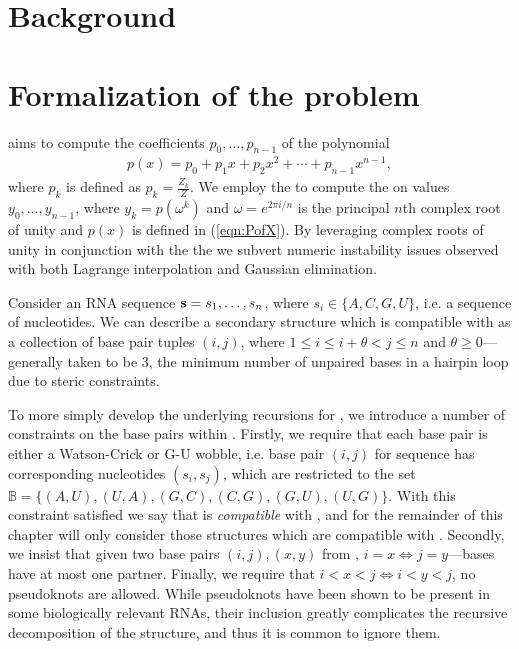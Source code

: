 \section{Background}

\section{Formalization of the problem}

\FFTbor aims to compute the coefficients $p_0,\ldots,p_{n-1}$ of the polynomial
\begin{eqnarray}
\label{eqn:PofX}
p(x) = p_0 + p_1 x + p_2 x^2 + \cdots + p_{n-1} x^{n-1},
\end{eqnarray}
where $p_k$ is defined as $p_k = \frac{Z_k}{Z}$. We employ the \FFT to compute
the \iDFT on values $y_0,\ldots,y_{n-1}$, where
$y_k = p(\omega^k)$ and $\omega = e^{2 \pi i/n}$ is the principal $n$th complex
root of unity and $p(x)$ is defined in (\ref{eqn:PofX}). By leveraging complex
roots of unity in conjunction with the \iDFT the we subvert numeric instability
issues observed with both Lagrange interpolation and Gaussian elimination.

Consider an RNA sequence ${\bf s} = s_1,\ldots,s_n$, where
$s_i \in \{A,C,G,U\}$, i.e. a sequence of nucleotides. We can describe a
secondary structure \strS which is compatible with \seq as a collection of
base pair tuples $(i,j)$, where $1 \le i \le i+\theta < j \le n$ and
$\theta \ge 0$---generally taken to be 3, the minimum number of unpaired bases
in a hairpin loop due to steric constraints.

To more simply develop the underlying recursions for \FFTbor, we introduce a
number of constraints on the base pairs within \strS. Firstly, we require that
each base pair is either a Watson-Crick or G-U wobble, i.e. base pair $(i,j)$
for sequence \seq has corresponding nucleotides $(s_i,s_j)$, which are
restricted
to the set $\mathbb{B} = \{(A,U), (U,A), (G,C), (C,G), (G,U), (U,G)\}$. With
this constraint satisfied we say that \strS is {\em compatible} with \seq, and
for the remainder of this chapter will only consider those structures which are
compatible with \seq.
Secondly, we insist that given two base pairs $(i,j), (x,y)$ from \strS,
$i=x \iff j=y$---bases have at most one partner. Finally, we require that
$i<x<j \iff i<y<j$, no pseudoknots are allowed. While pseudoknots have been
shown to be present in some biologically relevant RNAs, their inclusion greatly
complicates the recursive decomposition of the structure, and thus it is common
to ignore them.

